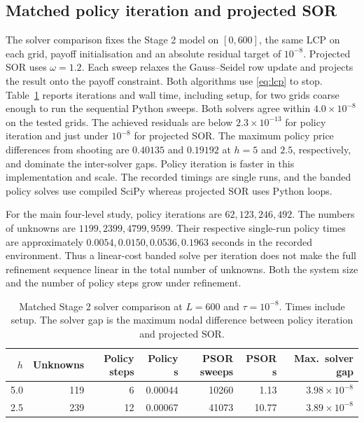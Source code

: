 \documentclass[11pt,a4paper]{article}
\numberwithin{equation}{section}
\begin{document}
\subsection{Matched policy iteration and projected SOR}
The solver comparison fixes the Stage 2 model on $[0,600]$, the same
LCP on each grid, payoff initialisation and an absolute residual target
of $10^{-8}$. Projected SOR uses $\omega=1.2$. Each sweep relaxes the
Gauss--Seidel row update and projects the result onto the payoff
constraint. Both algorithms use \eqref{eq:lcp} to stop.
Table~\ref{tab:cost} reports iterations and wall time, including setup,
for two grids coarse enough to run the sequential Python sweeps.
Both solvers agree within $4.0\times10^{-8}$ on the tested grids.
The achieved residuals are below $2.3\times10^{-13}$ for policy iteration
and just under $10^{-8}$ for projected SOR. The maximum policy price differences from shooting are $0.40135$
and $0.19192$ at $h=5$ and $2.5$, respectively, and dominate the
inter-solver gaps. Policy iteration is faster in this implementation
and scale. The recorded timings are single runs, and the banded policy
solves use compiled SciPy whereas projected SOR uses Python loops.

For the main four-level study, policy iterations are $62,123,246,492$.
The numbers of unknowns are $1199,2399,4799,9599$. Their respective
single-run policy times are approximately $0.0054,0.0150,0.0536,0.1963$
seconds in the recorded environment. Thus a linear-cost banded solve per
iteration does not make the full refinement sequence linear in the total
number of unknowns. Both the system size and the number of policy steps
grow under refinement.

\begin{table}[htbp]
\centering\small
\caption{Matched Stage 2 solver comparison at $L=600$ and
$\tau=10^{-8}$. Times include setup. The solver gap is the maximum
nodal difference between policy iteration and projected SOR.}
\label{tab:cost}
\begin{tabular}{@{}rrrrrrr@{}}
\toprule
$h$ & Unknowns & Policy steps & Policy s & PSOR sweeps & PSOR s & Max.\ solver gap\\
\midrule
5.0 & 119 & 6  & 0.00044 & 10260 & 1.13 & $3.98\times10^{-8}$\\
2.5 & 239 & 12 & 0.00067 & 41073 & 10.77 & $3.89\times10^{-8}$\\
\bottomrule
\end{tabular}
\end{table}
\end{document}
